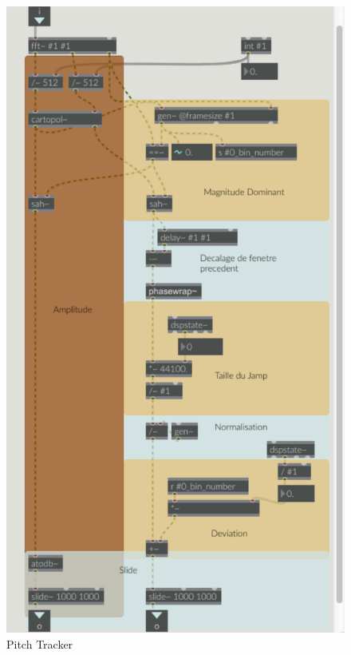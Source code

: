     \begin{figure}
        \centering
        \includegraphics[width = \textwidth ]{Graphs/ffttracker.png}
        \caption{Pitch Tracker}
        \label{PitchTracker}
    \end{figure}

